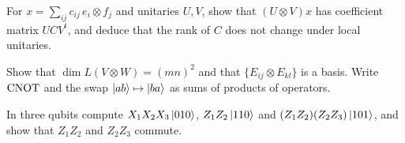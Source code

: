 \begin{exerciseset}
  \label{ex:local-unitary-matrix} For $x=\sum_{ij}c_{ij}\,e_i\otimes f_j$ and unitaries $U,V$, show that $(U\otimes V)x$ has coefficient matrix $UCV^t$, and deduce that the rank of $C$ does not change under local unitaries.

   Show that $\dim L(V\otimes W)=(mn)^2$ and that $\{E_{ij}\otimes E_{kl}\}$ is a basis. Write $\mathrm{CNOT}$ and the swap $\left|ab\right\rangle\mapsto\left|ba\right\rangle$ as sums of products of operators.

   In three qubits compute $X_1X_2X_3\left|010\right\rangle$, $Z_1Z_2\left|110\right\rangle$ and $(Z_1Z_2)(Z_2Z_3)\left|101\right\rangle$, and show that $Z_1Z_2$ and $Z_2Z_3$ commute.
\end{exerciseset}
